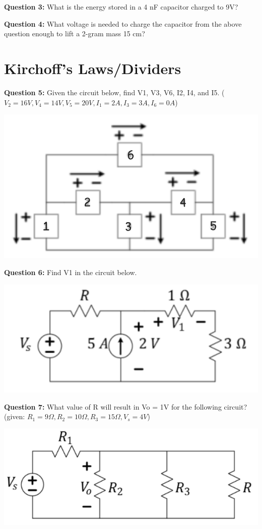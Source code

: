 \documentclass{article}
\begin{document}
\textbf{Question 3:} What is the energy stored in a 4 nF capacitor charged to 9V?

\textbf{Question 4:} What voltage is needed to charge the capacitor from the above question enough to lift a 2-gram mass 15 cm?

\section*{Kirchoff's Laws/Dividers}

\textbf{Question 5:} Given the circuit below, find V1, V3, V6, I2, I4, and I5. ($V_2=16V, V_4=14V, V_5=20V, I_1=2A, I_3=3A, I_6=0A$)

\begin{center}
    \includegraphics[width=0.75\linewidth]{figures/2.png}
\end{center}

\textbf{Question 6:} Find V1 in the circuit below.

\begin{center}
    \includegraphics[width=0.75\linewidth]{figures/3.png}
\end{center}

\textbf{Question 7:} What value of R will result in Vo = 1V for the following circuit? (given: $R_1=9\Omega, R_2=10\Omega, R_3=15\Omega, V_s=4V$)

\begin{center}

    \includegraphics[width=0.75\linewidth]{figures/5.png}

\end{center}
\end{document}
